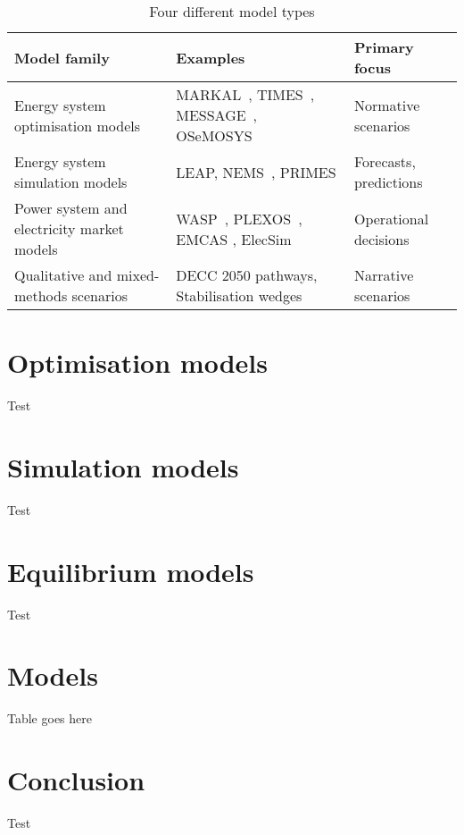 \begin{table}[]
	\footnotesize
	\caption{Four different model types \cite{Pfenninger2014a}}
	\label{tab:intro:modeltypes}
	\begin{tabular}{@{}lll@{}}
		\toprule
		Model family                               & Examples                                 & Primary focus                            \\ \midrule
		Energy system optimisation models          & MARKAL~\cite{Fishbone1981a}, TIMES~\cite{Giannakidis2013}, MESSAGE~\cite{Schrattenholzer1981}, OSeMOSYS~\cite{Howells2011a}        & Normative scenarios                      \\
		Energy system simulation models            & LEAP\cite{LEAP2012a}, NEMS~\cite{Grozev2005a}, PRIMES\cite{Capros2012}                       & Forecasts, predictions                   \\
		Power system and electricity market models & WASP~\cite{WASP2001}, PLEXOS~\cite{PLEXOS2013}, EMCAS \cite{Conzelmann}, ElecSim\cite{Kell}             & Operational decisions \\
		Qualitative and mixed-methods scenarios    & DECC 2050 pathways, Stabilisation wedges & Narrative scenarios                      \\ \bottomrule
	\end{tabular}
\end{table}

\section{Optimisation models}

Test

\section{Simulation models}

Test

\section{Equilibrium models}

Test

\section{Models}

Table goes here

\section{Conclusion}

Test